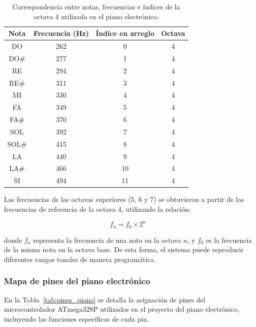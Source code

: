 \begin{table}[H]
\centering
\begin{tabular}{|c|c|c|c|}
\hline
\textbf{Nota} & \textbf{Frecuencia (Hz)} & \textbf{Índice en arreglo} & \textbf{Octava} \\
\hline
DO  & 262 & 0  & 4 \\
DO\# & 277 & 1  & 4 \\
RE  & 294 & 2  & 4 \\
RE\# & 311 & 3  & 4 \\
MI  & 330 & 4  & 4 \\
FA  & 349 & 5  & 4 \\
FA\# & 370 & 6  & 4 \\
SOL & 392 & 7  & 4 \\
SOL\# & 415 & 8  & 4 \\
LA  & 440 & 9  & 4 \\
LA\# & 466 & 10 & 4 \\
SI  & 494 & 11 & 4 \\
\hline
\end{tabular}
\caption{Correspondencia entre notas, frecuencias e índices de la octava 4 utilizada en el piano electrónico.}
\label{tab:notas_piano}
\end{table}

Las frecuencias de las octavas superiores (5, 6 y 7) se obtuvieron a partir de las frecuencias de referencia de la octava 4, 
utilizando la relación:

\[
f_{n} = f_{0} \times 2^{n}
\]

donde \( f_{n} \) representa la frecuencia de una nota en la octava \( n \), 
y \( f_{0} \) es la frecuencia de la misma nota en la octava base. 
De esta forma, el sistema puede reproducir diferentes rangos tonales de manera programática.

\vspace{0.5cm}

\subsubsection{Mapa de pines del piano electrónico}

En la Tabla~\ref{tab:pines_piano} se detalla la asignación de pines del microcontrolador ATmega328P utilizados en el proyecto del piano electrónico, incluyendo las funciones específicas de cada pin.

